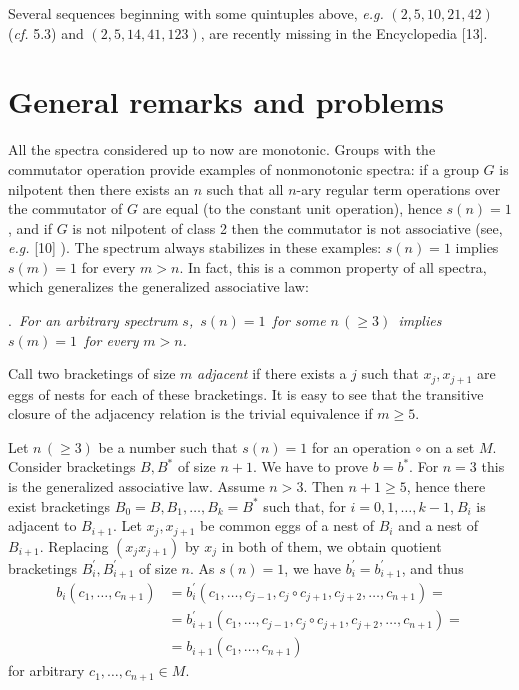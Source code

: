 \documentclass[a4paper,reqno]{amsart}\usepackage{amssymb,latexsym}
\theoremstyle{definition}
\theoremstyle{remark}
\numberwithin{equation}{section}
\numberwithin{theorem}{section}
\begin{document}
\noindent Several sequences beginning with some quintuples above,
\textit{e.g.} $(2,5,10,21,42)$ (\textit{cf.} 5.3) and $(2,5,14,41,123)$, are
recently missing in the Encyclopedia [13].

\section{General remarks and problems}

\smallskip

All the spectra considered up to now are monotonic. Groups with the commutator
operation provide examples of nonmonotonic spectra: if a group $G$ is
nilpotent then there exists an $n$ such that all $n$-ary regular term
operations over the commutator of $G$ are equal (to the constant unit
operation), hence $s(n)=1$, and if $G$ is not nilpotent of class 2 then the
commutator is not associative (see, \textit{e.g.} [10]
). The spectrum always stabilizes in these examples: $s(n)=1$ implies $s(m)=1
$ for every $m>n$. In fact, this is a common property of all spectra, which
generalizes the generalized associative law:

\bigskip

.\textit{\ For an arbitrary spectrum }$s$\textit{,~}$s(n)=1$\textit{\ for some }$n\,(\geq3)$\textit{\ implies }$s(m)=1$\textit{\ for every }$m>n$\textit{.}

\smallskip

Call two bracketings of size $m$ \textit{adjacent} if there exists a $j$ such
that $x_{j},x_{j+1}$ are eggs of nests for each of these bracketings. It is
easy to see that the transitive closure of the adjacency relation is the
trivial equivalence if $m\geq5$.

Let $n\,(\geq3)$ be a number such that $s(n)=1$ for an operation $\circ$ on a
set $M$. Consider bracketings $B,B^{\ast}$ of size $n+1$. We have to prove
$b=b^{\ast}$. For $n=3$ this is the generalized associative law. Assume $n>3$.
Then $n+1\geq5$, hence there exist bracketings $B_{0}=B,B_{1},\ldots
,B_{k}=B^{\ast}$ such that, for $i=0,1,\ldots,k-1$,$~B_{i}$ is adjacent to
$B_{i+1}$. Let $x_{j},x_{j+1}$ be common eggs of a nest of $B_{i}$ and a nest
of $B_{i+1}$. Replacing $(x_{j}x_{j+1})$ by $x_{j} $ in both of them, we
obtain quotient bracketings $B_{i}^{\prime},B_{i+1}^{\prime}$ of size $n$. As
$s(n)=1$, we have $b_{i}^{\prime}=b_{i+1}^{\prime}$, and thus\begin{align*}
b_{i}(c_{1},\ldots,c_{n+1})  &  =b_{i}^{\prime}(c_{1},\ldots,c_{j-1},c_{j}\circ c_{j+1},c_{j+2},\ldots,c_{n+1})=\\
&  =b_{i+1}^{\prime}(c_{1},\ldots,c_{j-1},c_{j}\circ c_{j+1},c_{j+2},\ldots,c_{n+1})=\\
&  =b_{i+1}(c_{1},\ldots,c_{n+1})
\end{align*}
for arbitrary $c_{1},\ldots,c_{n+1}\in M$.
\end{document}
